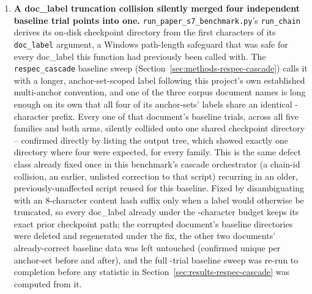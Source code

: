 \documentclass[11pt]{article}
\DeclareRobustCommand{\claim}[2]{#2}
\begin{document}
\begin{enumerate}
  as a uniform, document-specific failure pattern -- all four anchor-sets on one of the three
  corpus documents (\texttt{jcshm-si.docx}, confirmed directly to have zero References/Bibliography
  headings, unlike the other two) failing identically while the other two documents mostly passed
  -- which we traced to this exact mechanism before concluding it was real signal rather than a
  defect, following the same discipline as every earlier correction in this section. \claim{defect-fixes-code-only-grading-unchanged}{Fixed by
  treating the heading text as an expected addition specifically when it is absent from the
  document's own pre-edit paragraph list;} verified directly against the real checkpoint output
  files for both the affected document (the check now passes) and an unaffected one that already
  had a heading under different text (unchanged, confirming no regression).
\item\label{def:doclabel-collision} \claim{respec-harness-defects-8-9}{\textbf{A doc\_label truncation collision silently merged four independent baseline trial
  points into one.}} \texttt{run\_paper\_s7\_benchmark.py}'s \texttt{run\_chain} derives its
  on-disk checkpoint directory from the first  characters of its \texttt{doc\_label} argument,
  a Windows path-length safeguard that was safe for every doc\_label this function had previously
  been called with. \claim{run-chain-reused-unmodified}{The \texttt{respec\_cascade} baseline sweep (Section~\ref{sec:methods-respec-cascade})
  calls it with a longer, anchor-set-scoped label} following this project's own established
  multi-anchor convention, and one of the three corpus document names is long enough on its own
  that all four of its anchor-sets' labels share an identical -character prefix. Every one of
  that document's baseline trials, \claim{respec-five-families-table-dropped}{across all five families and both arms,} silently collided onto
  one shared checkpoint directory -- confirmed directly by listing the output tree, which showed
  exactly one directory where four were expected, for every family. This is the same defect class
  already fixed once in this benchmark's cascade orchestrator (\claim{ten-defects-count}{a chain-id collision, an earlier,
  unlisted correction to that script}) \claim{run-chain-reused-unmodified}{recurring in an older, previously-unaffected script reused
  for this baseline.} \claim{run-chain-reused-unmodified}{Fixed by disambiguating with an 8-character content hash suffix only when a
  label would otherwise be truncated, so every doc\_label already under the \val{defects.doclabel.prefix_chars}-character budget
  keeps its exact prior checkpoint path;} the corrupted document's baseline directories were
  deleted and regenerated under the fix, the other two documents' already-correct baseline data
  was left untouched (confirmed unique per anchor-set before and after), and the full -trial
  baseline sweep was re-run to completion before any statistic in Section~\ref{sec:results-respec-cascade}
  was computed from it.
\end{enumerate}
\end{document}
